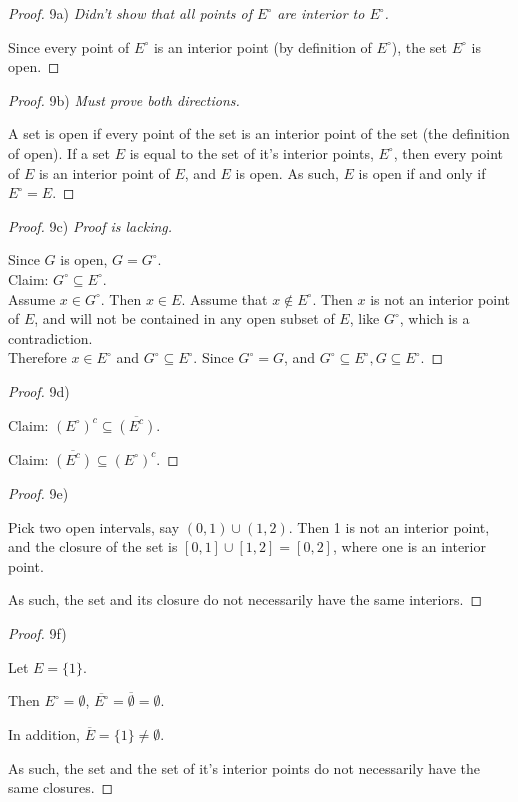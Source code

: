 \documentclass[10pt]{article}
\theoremstyle{definition}
\theoremstyle{plain}
\begin{document}
\begin{proof}
9a) \textit{Didn't show that all points of $E^\circ$ are interior to $E^\circ$.}

Since every point of $E^\circ$ is an interior point (by definition of $E^\circ$), the set $E^\circ$ is open.
\end{proof}

\begin{proof}
9b) \textit{Must prove both directions.}

A set is open if every point of the set is an interior point of the set (the definition of open). If a set $E$ is equal to the set of it's interior points, $E^\circ$, then every point of $E$ is an interior point of $E$, and $E$ is open. As such, $E$ is open if and only if $E^\circ = E$.
\end{proof}

\begin{proof}
9c) \textit{Proof is lacking.}

Since $G$ is open, $G=G^\circ$. \\

Claim: $G^\circ \subseteq E^\circ$. \\

Assume $x\in G^\circ$. Then $x\in E$.
Assume that $x\not\in E^\circ.$ Then $x$ is not an interior point of $E$, and will not be contained in any open subset of $E$, like $G^\circ$, which is a contradiction. \\

Therefore $x\in E^\circ$ and $G^\circ \subseteq E^\circ$. Since $G^\circ = G$, and $G^\circ \subseteq E^\circ, G\subseteq E^\circ$.
\end{proof}

\begin{proof}
9d)

Claim: $(E^\circ)^c \subseteq \overline{(E^c)}$.

Claim: $\overline{(E^c)} \subseteq (E^\circ)^c$.
\end{proof}

\begin{proof}
9e)

Pick two open intervals, say $(0,1)\cup(1,2)$. Then 1 is not an interior point, and the closure of the set is $[0,1]\cup[1,2] = [0,2]$, where one is an interior point.

As such, the set and its closure do not necessarily have the same interiors.
\end{proof}


\begin{proof}
9f)

Let $E=\{1\}$.

Then $E^\circ = \emptyset$, $\overline{E^\circ} = \overline{\emptyset} = \emptyset$.

In addition, $\overline{E} = \{1\} \neq \emptyset$.

As such, the set and the set of it's interior points do not necessarily have the same closures.
\end{proof}
\end{document}

